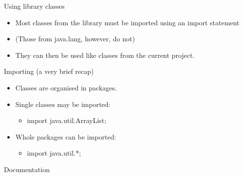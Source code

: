 \documentclass{beamer}
\begin{document}
\begin{frame}
\end{frame} \begin{frame}

Using library classes

\begin{itemize}
\item Most classes from the library must be imported using an import statement 
\item (Those from java.lang, however, do not)
\item They can then be used like classes from the current project.
\end{itemize}

\end{frame} \begin{frame}

Importing (a very brief recap)

\begin{itemize}
\item Classes are organised in packages. 
\item Single classes may be imported:

\begin{itemize}
\item import java.util.ArrayList;
\end{itemize}
\item Whole packages can be imported:

\begin{itemize}
\item import java.util.*;
\end{itemize}
\end{itemize}

\end{frame} \begin{frame}

\centering
Documentation

\end{frame} 
\end{document}
